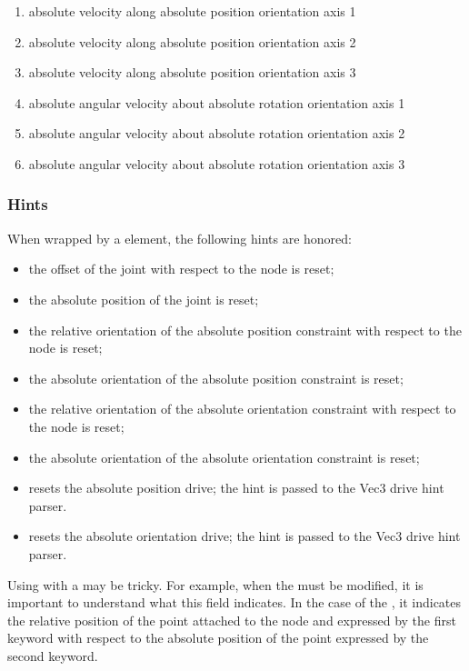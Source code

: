 \begin{enumerate}
\item {} absolute velocity along absolute position orientation axis 1
\item {} absolute velocity along absolute position orientation axis 2
\item {} absolute velocity along absolute position orientation axis 3

\item {} absolute angular velocity about absolute rotation orientation axis 1
\item {} absolute angular velocity about absolute rotation orientation axis 2
\item {} absolute angular velocity about absolute rotation orientation axis 3
\end{enumerate}

\subsubsection{Hints}
When wrapped by a  element, the following hints are honored:
\begin{itemize}
\item {} the offset of the joint
with respect to the node is reset;
\item {} the absolute position of the joint
is reset;
\item {} the relative orientation
of the absolute position constraint with respect to the node is reset;
\item {} the absolute orientation 
of the absolute position constraint is reset;
\item {} the relative orientation
of the absolute orientation constraint with respect to the node is reset;
\item {} the absolute orientation 
of the absolute orientation constraint is reset;
\item {} resets the absolute position drive;
the hint is passed to the Vec3 drive hint parser.
\item {} resets the absolute orientation drive;
the hint is passed to the Vec3 drive hint parser.
\end{itemize}
Using  with a  may be tricky.
For example, when the  must be modified,
it is important to understand what this field indicates.
In the case of the , it indicates
the relative position of the point attached to the node and expressed by the first  keyword
with respect to the absolute position of the point expressed by the second  keyword.

